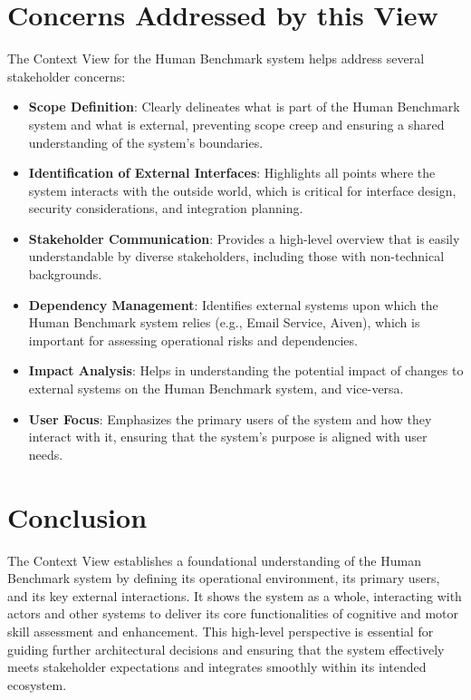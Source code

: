 \section{Concerns Addressed by this View}
The Context View for the Human Benchmark system helps address several stakeholder concerns:

\begin{itemize}
    \item \textbf{Scope Definition}: Clearly delineates what is part of the Human Benchmark system and what is external, preventing scope creep and ensuring a shared understanding of the system's boundaries.
    \item \textbf{Identification of External Interfaces}: Highlights all points where the system interacts with the outside world, which is critical for interface design, security considerations, and integration planning.
    \item \textbf{Stakeholder Communication}: Provides a high-level overview that is easily understandable by diverse stakeholders, including those with non-technical backgrounds.
    \item \textbf{Dependency Management}: Identifies external systems upon which the Human Benchmark system relies (e.g., Email Service, Aiven), which is important for assessing operational risks and dependencies.
    \item \textbf{Impact Analysis}: Helps in understanding the potential impact of changes to external systems on the Human Benchmark system, and vice-versa.
    \item \textbf{User Focus}: Emphasizes the primary users of the system and how they interact with it, ensuring that the system's purpose is aligned with user needs.
\end{itemize}

\section{Conclusion}
The Context View establishes a foundational understanding of the Human Benchmark system by defining its operational environment, its primary users, and its key external interactions. It shows the system as a whole, interacting with actors and other systems to deliver its core functionalities of cognitive and motor skill assessment and enhancement. This high-level perspective is essential for guiding further architectural decisions and ensuring that the system effectively meets stakeholder expectations and integrates smoothly within its intended ecosystem.
